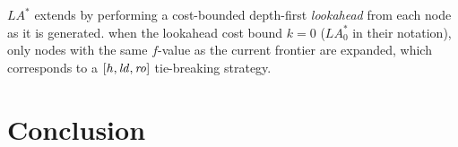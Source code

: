 
$LA^*$ \cite{stern2010look} extends \astar by performing a
cost-bounded depth-first \emph{lookahead} from each node as it is generated.
when the lookahead cost bound $k=0$ ($LA^*_0$ in their notation), only nodes with the same $f$-value as the current \astar frontier are expanded, which corresponds to a $[h,\mbox{\textit{ld}},\mbox{\textit{ro}}]$ tie-breaking strategy.


\section{Conclusion}

